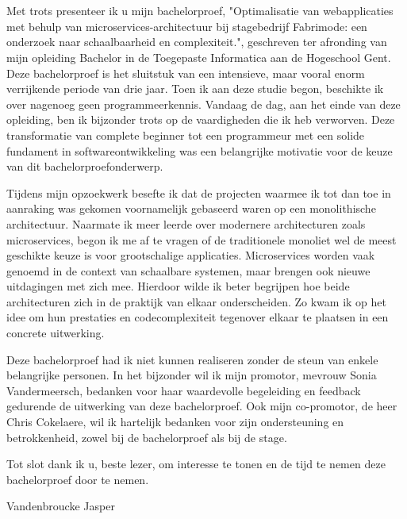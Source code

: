 
\chapter*{}%
\label{ch:voorwoord}


Met trots presenteer ik u mijn bachelorproef, "Optimalisatie van webapplicaties met behulp van microservices-architectuur bij stagebedrijf Fabrimode: een onderzoek naar schaalbaarheid en complexiteit.", geschreven ter afronding van mijn opleiding Bachelor in de Toegepaste Informatica aan de Hogeschool Gent. Deze bachelorproef is het sluitstuk van een intensieve, maar vooral enorm verrijkende periode van drie jaar. Toen ik aan deze studie begon, beschikte ik over nagenoeg geen programmeerkennis. Vandaag de dag, aan het einde van deze opleiding, ben ik bijzonder trots op de vaardigheden die ik heb verworven. Deze transformatie van complete beginner tot een programmeur met een solide fundament in softwareontwikkeling was een belangrijke motivatie voor de keuze van dit bachelorproefonderwerp.\newline

Tijdens mijn opzoekwerk besefte ik dat de projecten waarmee ik tot dan toe in aanraking was gekomen voornamelijk gebaseerd waren op een monolithische architectuur. Naarmate ik meer leerde over modernere architecturen zoals microservices, begon ik me af te vragen of de traditionele monoliet wel de meest geschikte keuze is voor grootschalige applicaties. Microservices worden vaak genoemd in de context van schaalbare systemen, maar brengen ook nieuwe uitdagingen met zich mee. Hierdoor wilde ik beter begrijpen hoe beide architecturen zich in de praktijk van elkaar onderscheiden. Zo kwam ik op het idee om hun prestaties en codecomplexiteit tegenover elkaar te plaatsen in een concrete uitwerking.\newline

Deze bachelorproef had ik niet kunnen realiseren zonder de steun van enkele belangrijke personen. In het bijzonder wil ik mijn promotor, mevrouw Sonia Vandermeersch, bedanken voor haar waardevolle begeleiding en feedback gedurende de uitwerking van deze bachelorproef. Ook mijn co-promotor, de heer Chris Cokelaere, wil ik hartelijk bedanken voor zijn ondersteuning en betrokkenheid, zowel bij de bachelorproef als bij de stage.\newline

Tot slot dank ik u, beste lezer, om interesse te tonen en de tijd te nemen deze bachelorproef door te nemen.\newline

Vandenbroucke Jasper